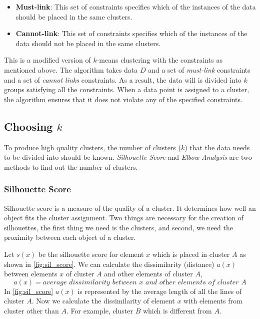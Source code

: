 \begin{itemize}
    \item \textbf{Must-link}: This set of constraints specifies which of the instances of the data should be placed in the same clusters.
    \item \textbf{Cannot-link}: This set of constraints specifies which of the instances of the data should not be placed in the same clusters.
\end{itemize}

This is a modified version of $k$-means clustering with the constraints as mentioned above. The algorithm takes data $D$ and a set of \textit{must-link} constraints and a set of \textit{cannot links} constraints. As a result, the data will is divided into $k$ groups satisfying all the constraints. When a data point is assigned to a cluster, the algorithm ensures that it does not violate any of the specified constraints.

\subsection{Choosing $k$} \label{chooseK}
To produce high quality clusters, the number of clusters ($k$) that the data needs to be divided into should be known. \textit{Silhouette Score} \cite{rousseeuw1987silhouettes} and \textit{Elbow Analysis} \cite{thorndike1953belongs,ketchen1996application}  are two methods to find out the number of clusters.

\subsubsection{Silhouette Score}\label{silout}
Silhouette score is a measure of the quality of a cluster. It determines how well an object fits the cluster assignment. Two things are necessary for the creation of silhouettes, the first thing we need is the clusters, and second, we need the proximity between each object of a cluster.

Let $s(x)$ be the silhouette score for element $x$ which is placed in cluster $A$ as shown in \ref{fig:sil_score}. We can calculate the dissimilarity (distance) $a(x)$ between elements $x$ of cluster $A$ and other elements of cluster $A$,
\begin{equation}\label{eq:sil_1}
    a(x) = \textit{average dissimilarity between x and other elements of cluster A}
\end{equation}
In \ref{fig:sil_score} $a(x)$ is represented by the average length of all the lines of cluster $A$. Now we calculate the dissimilarity of element $x$ with elements from cluster other than $A$. For example, cluster $B$ which is different from $A$.

